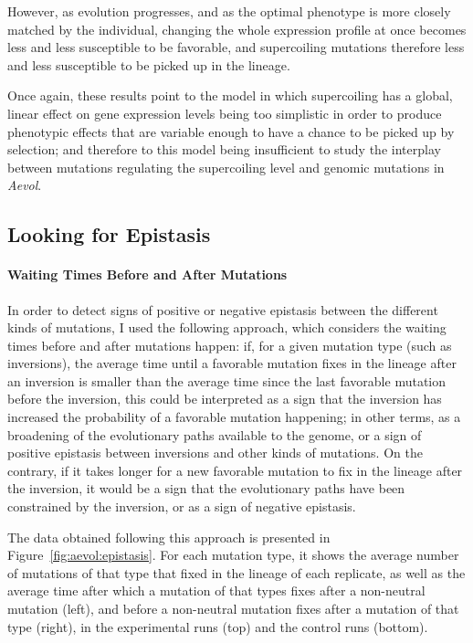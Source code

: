 However, as evolution progresses, and as the optimal phenotype is more closely matched by the individual, changing the whole expression profile at once becomes less and less susceptible to be favorable, and supercoiling mutations therefore less and less susceptible to be picked up in the lineage.

Once again, these results point to the model in which supercoiling has a global, linear effect on gene expression levels being too simplistic in order to produce phenotypic effects that are variable enough to have a chance to be picked up by selection; and therefore to this model being insufficient to study the interplay between mutations regulating the supercoiling level and genomic mutations in \emph{Aevol}.

\subsection{Looking for Epistasis}

\paragraph{Waiting Times Before and After Mutations}
In order to detect signs of positive or negative epistasis between the different kinds of mutations, I used the following approach, which considers the waiting times before and after mutations happen:
if, for a given mutation type (such as inversions), the average time until a favorable mutation fixes in the lineage after an inversion is smaller than the average time since the last favorable mutation before the inversion, this could be interpreted as a sign that the inversion has increased the probability of a favorable mutation happening; in other terms, as a broadening of the evolutionary paths available to the genome, or a sign of positive epistasis between inversions and other kinds of mutations.
On the contrary, if it takes longer for a new favorable mutation to fix in the lineage after the inversion, it would be a sign that the evolutionary paths have been constrained by the inversion, or as a sign of negative epistasis.

The data obtained following this approach is presented in Figure~\ref{fig:aevol:epistasis}.
For each mutation type, it shows the average number of mutations of that type that fixed in the lineage of each replicate, as well as the average time after which a mutation of that types fixes after a non-neutral mutation (left), and before a non-neutral mutation fixes after a mutation of that type (right), in the experimental runs (top) and the control runs (bottom).

